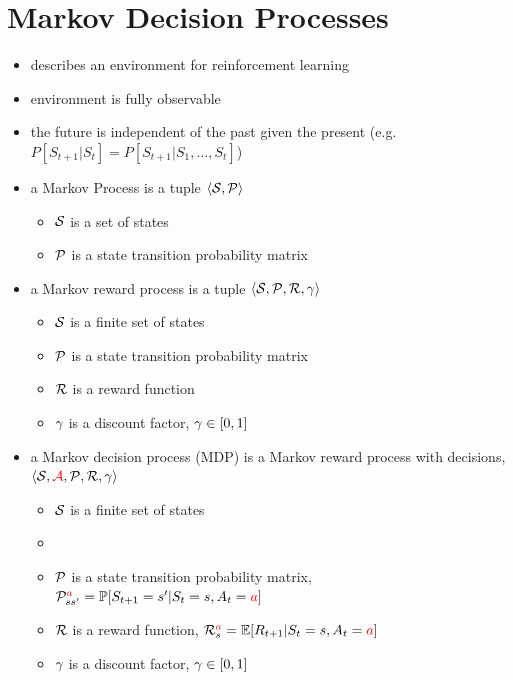 \documentclass[../main.tex]{subfiles}
\begin{document}
\section{Markov Decision Processes}
  \begin{itemize}
    \item describes an environment for reinforcement learning
    \item environment is fully observable
    \item the future is independent of the past given the present (e.g. $P[S_{t+1}|S_{t}] = P[S_{t+1}|S_{1}, ..., S_{t}]$)
    \item a Markov Process is a tuple $\langle \mathcal{S}, \mathcal{P} \rangle$
    \begin{itemize}
      \item $\mathcal{S}$ is a set of states
      \item $\mathcal{P}$ is a state transition probability matrix
    \end{itemize}

    \item a Markov reward process is a tuple $\langle \mathcal{S}, \mathcal{P}, \mathcal{R}, \gamma \rangle$
    \begin{itemize}
      \item $\mathcal{S}$ is a finite set of states
      \item $\mathcal{P}$ is a state transition probability matrix
      \item $\mathcal{R}$ is a reward function
      \item $\gamma$ is a discount factor, $\gamma \in [0, 1]$
    \end{itemize}

    \item a Markov decision process (MDP) is a Markov reward process with decisions, $\langle \mathcal{S}, \textcolor{red}{\mathcal{A}}, \mathcal{P}, \mathcal{R}, \gamma \rangle$
    \begin{itemize}
      \item $\mathcal{S}$ is a finite set of states
      \item {}
      \item $\mathcal{P}$ is a state transition probability matrix, $\mathcal{P}_{ss'}^{\textcolor{red}{a}} = \mathbb{P}[S_{t+1} = s' | S_{t} = s, A_{t} = \textcolor{red}{a}]$
      \item $\mathcal{R}$ is a reward function, $\mathcal{R}_{s}^{\textcolor{red}{a}} = \mathbb{E}[R_{t+1} | S_{t} = s, A_{t} = \textcolor{red}{a}]$
      \item $\gamma$ is a discount factor, $\gamma \in [0, 1]$
    \end{itemize}


\end{itemize}
\end{document}
